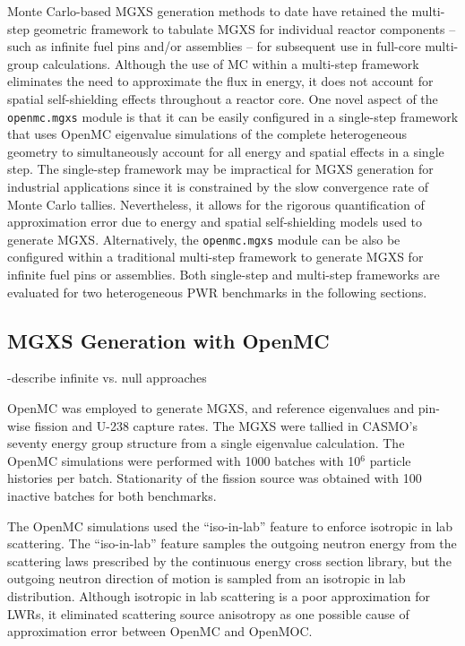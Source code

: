 Monte Carlo-based MGXS generation methods to date have retained the multi-step geometric framework to tabulate MGXS for individual reactor components -- such as infinite fuel pins and/or assemblies -- for subsequent use in full-core multi-group calculations. Although the use of MC within a multi-step framework eliminates the need to approximate the flux in energy, it does not account for spatial self-shielding effects throughout a reactor core. One novel aspect of the \texttt{openmc.mgxs} module is that it can be easily configured in a single-step framework that uses OpenMC eigenvalue simulations of the complete heterogeneous geometry to simultaneously account for all energy and spatial effects in a single step. The single-step framework may be impractical for MGXS generation for industrial applications since it is constrained by the slow convergence rate of Monte Carlo tallies. Nevertheless, it allows for the rigorous quantification of approximation error due to energy and spatial self-shielding models used to generate MGXS. Alternatively, the \texttt{openmc.mgxs} module can be also be configured within a traditional multi-step framework to generate MGXS for infinite fuel pins or assemblies. Both single-step and multi-step frameworks are evaluated for two heterogeneous PWR benchmarks in the following sections.


\subsection{MGXS Generation with OpenMC}
\label{subsec:openmc}

-describe infinite vs. null approaches

OpenMC was employed to generate MGXS, and reference eigenvalues and pin-wise fission and U-238 capture rates. The MGXS were tallied in CASMO's seventy energy group structure \cite{rhodes2006casmo} from a single eigenvalue calculation. The OpenMC simulations were performed with 1000 batches with 10$^{6}$ particle histories per batch. Stationarity of the fission source was obtained with 100 inactive batches for both benchmarks.

The OpenMC simulations used the ``iso-in-lab'' feature to enforce isotropic in lab scattering. The ``iso-in-lab'' feature samples the outgoing neutron energy from the scattering laws prescribed by the continuous energy cross section library, but the outgoing neutron direction of motion is sampled from an isotropic in lab distribution. Although isotropic in lab scattering is a poor approximation for LWRs, it eliminated scattering source anisotropy as one possible cause of approximation error between OpenMC and OpenMOC. 


